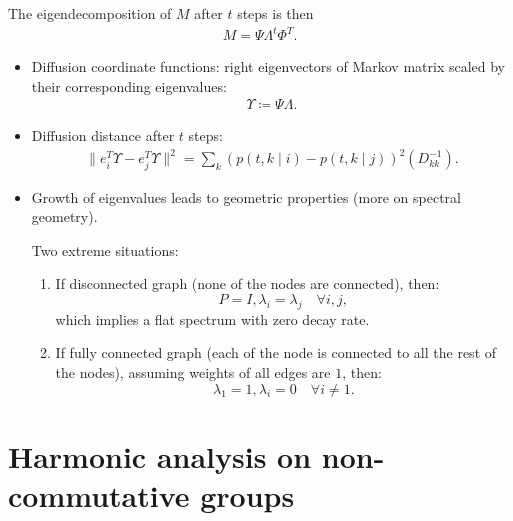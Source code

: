 \documentclass{article}
\begin{document}
\begin{enumerate}
    The eigendecomposition of $M$ after $t$ steps is then
    \begin{align}
        M = \Psi \Lambda^t \Phi^T.
    \end{align}
    
    \begin{itemize}
        \item Diffusion coordinate functions: right eigenvectors of Markov matrix scaled by their corresponding eigenvalues: 
        \begin{align}
            \Upsilon \coloneqq \Psi \Lambda.
        \end{align}
        \item Diffusion distance after $t$ steps: 
       \begin{align}
            \| e_i^T  \Upsilon - e_j^T \Upsilon  \|^2 = \sum_{k} (p(t,k\mid i) - p(t,k\mid j))^2 (D_{k k}^{-1}).
       \end{align}
       
       \item Growth of eigenvalues leads to geometric properties (more on spectral geometry).
       
       Two extreme situations:
       \begin{enumerate}
           \item If disconnected graph (none of the nodes are connected), then:
           \[P = I, \lambda_i = \lambda_j \quad \forall i, j, \]
           which implies a flat spectrum with zero decay rate.
           \item If fully connected graph (each of the node is connected to all the rest of the nodes), assuming weights of all edges are $1$, then:
            \[\lambda_1 = 1, \lambda_i = 0 \quad \forall i \neq 1.\]
       \end{enumerate}
    \end{itemize}
    
    
\end{enumerate}
\section{Harmonic analysis on non-commutative groups}
\end{document}
